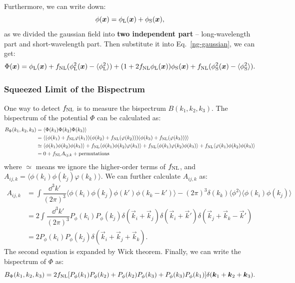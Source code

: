 Furthermore, we can write down:
\begin{equation}
    \phi(\vec{x}) = \phi_{\rm L}(\vec{x})+\phi_{\rm S}(\vec{x}),
\end{equation}
as we divided the gaussian field into {\bf two independent part} -- long-wavelength part and short-wavelength part. Then substitute it into Eq.~\ref{ng-gaussian}, we can get:
\begin{equation}
    \Phi(\vec{x}) = \phi_{\rm L}(\vec{x}) + f_{\rm NL}(\phi^2_{\rm L}(\vec{x}) - \langle \phi_{\rm L}^2\rangle ) + (1+2f_{\rm NL}\phi_{\rm L}(\vec{x})) \phi_{\rm S}(\vec{x}) + f_{\rm NL}(\phi_{\rm S}^2(\vec{x}) - \langle  \phi_{\rm S}^2 \rangle ).
    \label{ng-squeezed}
\end{equation}

\subsubsection{Squeezed Limit of the Bispectrum}
One way to detect $f_{\rm NL}$ is to measure the bispectrum $B(k_1,k_2,k_3)$. The bispectrum of the potential $\Phi$ can be calculated as:
\begin{align*}
    B_\Phi(k_1,k_2,k_3) & = \langle \Phi(k_1)\Phi(k_2)\Phi(k_3) \rangle \\
    & = \langle (\phi(k_1) + f_{\rm NL}\varphi(k_1))(\phi(k_2) + f_{\rm NL}(\varphi(k_2)))(\phi(k_3) + f_{\rm NL}(\varphi(k_3))) \rangle\\
    & \simeq  \langle \phi(k_1)\phi(k_2)\phi(k_3) \rangle + f_{\rm NL} \langle \phi(k_1)\phi(k_2)\varphi(k_3) \rangle + f_{\rm NL} \langle \phi(k_1)\varphi(k_2)\phi(k_3) \rangle + f_{\rm NL} \langle \varphi(k_1)\phi(k_2)\phi(k_3) \rangle\\
    & = 0 + f_{\rm NL} A_{ij,k} + \mathrm{permutations} \\
\end{align*}
where $\simeq$ means we ignore the higher-order terms of $f_{\rm NL}$, and $A_{ij,k} = \langle \phi(k_i)\phi(k_j)\varphi(k_k) \rangle$. We can further calculate $A_{ij,k}$ as:
\begin{align*}
    A_{ij,k} & = \int \dfrac{\dd^3 k'}{(2\pi)^3} \langle \phi(k_i)\phi(k_j)\phi(k')\phi(k_k-k') \rangle - (2\pi)^3\delta(k_k)\langle \phi^2\rangle \langle \phi(k_i)\phi(k_j) \rangle \\
    & = 2\int \dfrac{\dd^3 k'}{(2\pi)^3} P_\phi(k_i)P_\phi(k_j)\delta(\vec{k}_i+\vec{k}_j)\delta(\vec{k}_i+\vec{k}')\delta(\vec{k}_j+\vec{k}_k-\vec{k}') \\
    & = 2P_\phi(k_i)P_\phi(k_j)\delta(\vec{k}_i+\vec{k}_j+\vec{k}_k).
\end{align*}
The second equation is expanded by Wick theorem. Finally, we can write the bispectrum of $\Phi$ as:
\begin{equation}
    B_\Phi(k_1,k_2,k_3) = 2f_{\rm NL} [P_\phi(k_1)P_\phi(k_2) + P_\phi(k_2)P_\phi(k_3) + P_\phi(k_3)P_\phi(k_1)]\delta(\vec{k}_1+\vec{k}_2+\vec{k}_3).
\end{equation}

